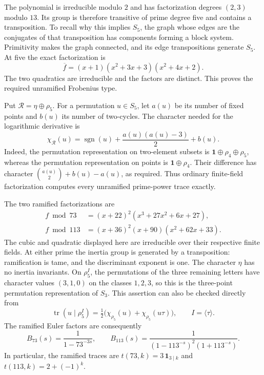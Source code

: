 \documentclass[11pt]{article}
\theoremstyle{definition}
\theoremstyle{remark}
\newcommand{\one}{\mathbf 1}
\newcommand{\rh}{\rho_5}
\numberwithin{equation}{section}
\begin{document}
The polynomial is irreducible modulo $2$ and has factorization degrees $(2,3)$ modulo $13$. Its group is therefore transitive of prime degree five and contains a transposition. To recall why this implies $S_5$, the graph whose edges are the conjugates of that transposition has components forming a block system. Primitivity makes the graph connected, and its edge transpositions generate $S_5$. At five the exact factorization is
\[
\overline f=(x+1)(x^2+3x+3)(x^2+4x+2).
\]
The two quadratics are irreducible and the factors are distinct. This proves the required unramified Frobenius type.

Put $\mathcal R=\eta\oplus\rh$. For a permutation $u\in S_5$, let $a(u)$ be its number of fixed points and $b(u)$ its number of two-cycles. The character needed for the logarithmic derivative is
\begin{equation}\label{eq:traceformula}
\chi_{\mathcal R}(u)=\operatorname{sgn}(u)
+\frac{a(u)(a(u)-3)}2+b(u).
\end{equation}
Indeed, the permutation representation on two-element subsets is
$\one\oplus\rho_4\oplus\rh$, whereas the permutation representation on points is $\one\oplus\rho_4$. Their difference has character
$\binom{a(u)}2+b(u)-a(u)$, as required. Thus ordinary finite-field factorization computes every unramified prime-power trace exactly.

The two ramified factorizations are
\begin{align*}
 f\bmod73&=(x+22)^2(x^3+27x^2+6x+27),\\
 f\bmod113&=(x+36)^2(x+90)(x^2+62x+33).
\end{align*}
The cubic and quadratic displayed here are irreducible over their respective finite fields. At either prime the inertia group is generated by a transposition: ramification is tame, and the discriminant exponent is one. The character $\eta$ has no inertia invariants. On $\rh^I$, the permutations of the three remaining letters have character values $(3,1,0)$ on the classes $1,2,3$, so this is the three-point permutation representation of $S_3$. This assertion can also be checked directly from
\[
\operatorname{tr}(u\mid\rh^I)
=\tfrac12\bigl(\chi_{\rh}(u)+\chi_{\rh}(u\tau)\bigr),
\qquad I=\langle\tau\rangle.
\]
The ramified Euler factors are consequently
\begin{equation}\label{eq:bad8249}
 B_{73}(s)=\frac1{1-73^{-3s}},\qquad
 B_{113}(s)=\frac1{(1-113^{-s})^2(1+113^{-s})}.
\end{equation}
In particular, the ramified traces are $t(73,k)=3\,\one_{3\mid k}$ and $t(113,k)=2+(-1)^k$.
\end{document}
